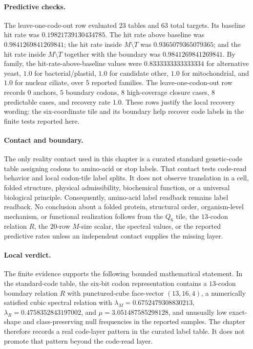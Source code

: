 \paragraph{Predictive checks.}
The leave-one-code-out row evaluated $23$ tables and $63$ total targets. Its baseline hit rate was $0.19821739130434785$. The hit rate above baseline was $0.9841269841269841$; the hit rate inside $M\setminus T$ was $0.9365079365079365$; and the hit rate inside $M\setminus T$ together with the boundary was $0.9841269841269841$. By family, the hit-rate-above-baseline values were $0.8333333333333334$ for alternative yeast, $1.0$ for bacterial/plastid, $1.0$ for candidate other, $1.0$ for mitochondrial, and $1.0$ for nuclear ciliate, over $5$ reported families. The leave-one-codon-out row records $0$ anchors, $5$ boundary codons, $8$ high-coverage closure cases, $8$ predictable cases, and recovery rate $1.0$. These rows justify the local recovery wording: the six-coordinate tile and its boundary help recover code labels in the finite tests reported here.

\paragraph{Contact and boundary.}
The only reality contact used in this chapter is a curated standard genetic-code table assigning codons to amino-acid or stop labels. That contact tests code-read behavior and local codon-tile label splits. It does not observe translation in a cell, folded structure, physical admissibility, biochemical function, or a universal biological principle. Consequently, amino-acid label readback remains label readback. No conclusion about a folded protein, structural order, organism-level mechanism, or functional realization follows from the $Q_6$ tile, the $13$-codon relation $R$, the $20$-row $M$-size scalar, the spectral values, or the reported predictive rates unless an independent contact supplies the missing layer.

\paragraph{Local verdict.}
The finite evidence supports the following bounded mathematical statement. In the standard-code table, the six-bit codon representation contains a $13$-codon boundary relation $R$ with punctured-cube face-vector $(13,16,4)$, a numerically satisfied cubic spectral relation with $\lambda_M=0.6752479308830213$, $\lambda_R=0.4758352843197002$, and $\mu=3.051487585298128$, and unusually low exact-shape and class-preserving null frequencies in the reported samples. The chapter therefore records a real code-layer pattern in the curated label table. It does not promote that pattern beyond the code-read layer.